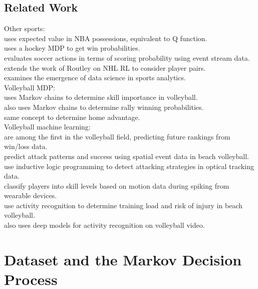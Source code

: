 \documentclass{sfuthesis}
\begin{document}
	\section{Related Work}
	Other sports:\\
	\cite{cervone2014pointwise} uses expected value in NBA possessions, equivalent to Q function.\\
	\cite{kaplan2014markov} uses a hockey MDP to get win probabilities.\\
	\cite{decroos2019actions} evaluates soccer actions in terms of scoring probability using event stream data.\\
	\cite{Ljung2019} extends the work of Routley on NHL RL to consider player pairs.\\
	\cite{claudino2019current} examines the emergence of data science in sports analytics.\\
	Volleyball MDP:\\
	\cite{miskin2010skill} uses Markov chains to determine skill importance in volleyball.\\
	\cite{florence2008skill} also uses Markov chains to determine rally winning probabilities.\\
	\cite{alexandros2012existence} same concept to determine home advantage.\\
	Volleyball machine learning:\\
	\cite{tumer2017prediction} are among the first in the volleyball field, predicting future rankings from win/loss data.\\
	\cite{wenninger2020performance} predict attack patterns and success using spatial event data in beach volleyball.\\
	\cite{van2016analyzing} use inductive logic programming to detect attacking strategies in optical tracking data.\\
	\cite{wang2018volleyball} classify players into skill levels based on motion data during spiking from wearable devices.\\
	\cite{kautz2017activity} use activity recognition to determine training load and risk of injury in beach volleyball.\\
	\cite{ibrahim2018deep} also uses deep models for activity recognition on volleyball video.
	
	
	\chapter{Dataset and the Markov Decision Process}
	
\end{document}
